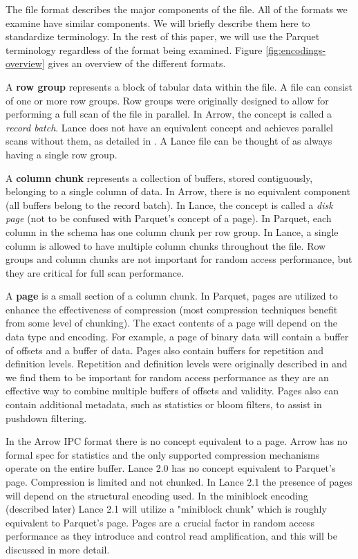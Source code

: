 \documentclass[sigconf, nonacm]{acmart}
\begin{document}
The file format describes the major components of the file.  All of the formats we examine have similar components.  We will briefly describe them here to standardize terminology.  In the rest of this paper, we will use the Parquet terminology regardless of the format being examined.  Figure \ref{fig:encodings-overview} gives an overview of the different formats.

A \textbf{row group} represents a block of tabular data within the file.  A file can consist of one or more row groups.  Row groups were originally designed to allow for performing a full scan of the file in parallel.  In Arrow, the concept is called a \textit{record batch}.  Lance does not have an equivalent concept and achieves parallel scans without them, as detailed in \cite{Lance2}.  A Lance file can be thought of as always having a single row group.

A \textbf{column chunk} represents a collection of buffers, stored contiguously, belonging to a single column of data.  In Arrow, there is no equivalent component (all buffers belong to the record batch).  In Lance, the concept is called a \textit{disk page} (not to be confused with Parquet's concept of a page).  In Parquet, each column in the schema has one column chunk per row group.  In Lance, a single column is allowed to have multiple column chunks throughout the file.  Row groups and column chunks are not important for random access performance, but they are critical for full scan performance.

A \textbf{page} is a small section of a column chunk.  In Parquet, pages are utilized to enhance the effectiveness of compression (most compression techniques benefit from some level of chunking).  The exact contents of a page will depend on the data type and encoding.  For example, a page of binary data will contain a buffer of offsets and a buffer of data.  Pages also contain buffers for repetition and definition levels.  Repetition and definition levels were originally described in \cite{Dremel} and we find them to be important for random access performance as they are an effective way to combine multiple buffers of offsets and validity.  Pages also can contain additional metadata, such as statistics or bloom filters, to assist in pushdown filtering.

In the Arrow IPC format there is no concept equivalent to a page.  Arrow has no formal spec for statistics and the only supported compression mechanisms operate on the entire buffer.  Lance 2.0 has no concept equivalent to Parquet's page.  Compression is limited and not chunked.  In Lance 2.1 the presence of pages will depend on the structural encoding used.  In the miniblock encoding (described later) Lance 2.1 will utilize a "miniblock chunk" which is roughly equivalent to Parquet's page.  Pages are a crucial factor in random access performance as they introduce and control read amplification, and this will be discussed in more detail.
\end{document}
